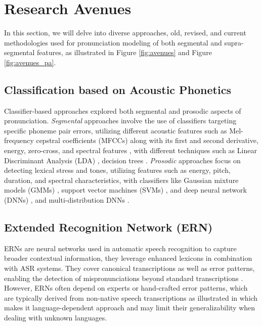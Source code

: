 \documentclass[11pt]{article}
\begin{document}
\section{Research Avenues}
In this section, we will delve into diverse approaches, old, revised, and current methodologies used for pronunciation modeling of both segmental and supra-segmental features, as illustrated in Figure \ref{fig:avenues} and Figure \ref{fig:avenues_pa}.
\label{sec:avenues}

% 
\subsection{Classification based on Acoustic Phonetics}
Classifier-based approaches explored both segmental and prosodic aspects of pronunciation. \textit{Segmental} approaches involve the use of classifiers targeting specific phoneme pair errors, utilizing different acoustic features such as Mel-frequency cepstral coefficients (MFCCs) along with its first and second derivative, energy, zero-cross, and spectral features \cite{van2009automatic,huang2020mispronunciation}, with different techniques such as Linear Discriminant Analysis (LDA) \cite{truong2004automatic,strik2009comparing}, decision trees \cite{strik2009comparing}. \textit{Prosodic} approaches focus on detecting lexical stress and tones, utilizing features such as energy, pitch, duration, and spectral characteristics, with classifiers like Gaussian mixture models (GMMs) \cite{ferrer2015classification}, support vector machines (SVMs) \cite{chen2010automatic,shahin2016automatic}, and deep neural network (DNNs) \cite{shahin2016automatic}, and multi-distribution DNNs \cite{li2018automatic}.

\subsection{Extended Recognition Network (ERN)}
ERNs are neural networks used in automatic speech recognition to capture broader contextual information, they leverage enhanced lexicons in combination with ASR systems. They cover canonical transcriptions as well as error patterns, enabling the detection of mispronunciations beyond standard transcriptions \cite{meng2007deriving,ronen1997automatic,qian2010capturing,li2016using}. However, ERNs often depend on experts or hand-crafted error patterns, which are typically derived from non-native speech transcriptions as illustrated in \cite{lo2010automatic} which makes it language-dependent approach and may limit their generalizability when dealing with unknown languages.
\end{document}
